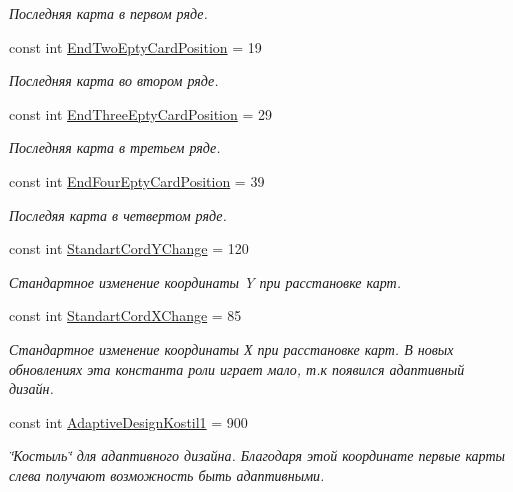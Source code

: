 \begin{DoxyCompactItemize}
\begin{DoxyCompactList}\small\item\em Последняя карта в первом ряде. \end{DoxyCompactList}\item 
const int \hyperlink{class_pasyans_cover_u_w_p_1_1_game_page_a8e347fd1f214283527b2cb865f4ee9b0}{End\+Two\+Epty\+Card\+Position} = 19
\begin{DoxyCompactList}\small\item\em Последняя карта во втором ряде. \end{DoxyCompactList}\item 
const int \hyperlink{class_pasyans_cover_u_w_p_1_1_game_page_a02e5496db08f9378c5e45e5fb1f082a1}{End\+Three\+Epty\+Card\+Position} = 29
\begin{DoxyCompactList}\small\item\em Последняя карта в третьем ряде. \end{DoxyCompactList}\item 
const int \hyperlink{class_pasyans_cover_u_w_p_1_1_game_page_ae99d856c36c65337c9b2d029d6b348d4}{End\+Four\+Epty\+Card\+Position} = 39
\begin{DoxyCompactList}\small\item\em Последяя карта в четвертом ряде. \end{DoxyCompactList}\item 
const int \hyperlink{class_pasyans_cover_u_w_p_1_1_game_page_a35b73571b9f97eec178604f4459d1af2}{Standart\+Cord\+Y\+Change} = 120
\begin{DoxyCompactList}\small\item\em Стандартное изменение координаты Y при расстановке карт. \end{DoxyCompactList}\item 
const int \hyperlink{class_pasyans_cover_u_w_p_1_1_game_page_aa61e21ef4cdac5b45ff280528dc5611e}{Standart\+Cord\+X\+Change} = 85
\begin{DoxyCompactList}\small\item\em Стандартное изменение координаты Х при расстановке карт. В новых обновлениях эта константа роли играет мало, т.\+к появился адаптивный дизайн. \end{DoxyCompactList}\item 
const int \hyperlink{class_pasyans_cover_u_w_p_1_1_game_page_ab0e63c0232b1953700a7765c3725c9d1}{Adaptive\+Design\+Kostil1} = 900
\begin{DoxyCompactList}\small\item\em \char`\"{}Костыль\char`\"{} для адаптивного дизайна. Благодаря этой координате первые карты слева получают возможность быть адаптивными. \end{DoxyCompactList}\item 

\end{DoxyCompactItemize}
